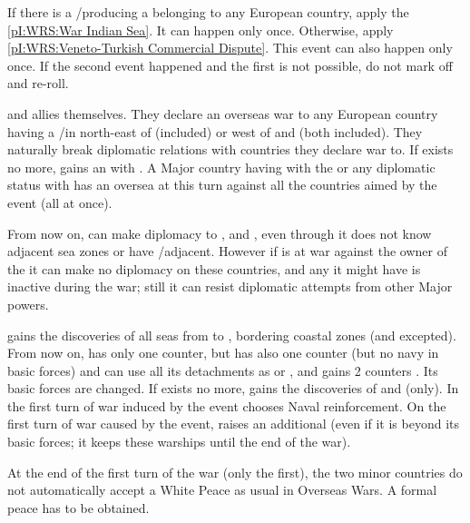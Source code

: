 \condition{}
\aparag If there is a \TP/\COL producing a \POSPICE belonging to any European
country, apply the \ref{pI:WRS:War Indian Sea}. It can happen only once.
\aparag Otherwise, apply \ref{pI:WRS:Veneto-Turkish Commercial Dispute}.  This
event can also happen only once.
\aparag If the second event happened and the first is not possible, do not
mark off and re-roll.



\phevnt
\aparag \paysEgypte and \paysGujerat allies themselves.  They declare an
overseas war to any European country having a \TP/\COL in \continentAfrica
north-east of \granderegionNatal (included) or \continentAsia west of
\granderegionMalaisie and \granderegionSumatra (both included). They naturally
break diplomatic relations with countries they declare war to.
\bparag If \paysEgypte exists no more, \TUR gains an \dipAT with \paysGujerat.
\aparag A Major country having  with the \paysGujerat or any
diplomatic status with \paysEgypte has an oversea \CB at this turn against all
the countries aimed by the event (all at once).

\phdipl
\aparag From now on, \VEN can make diplomacy to \paysAden, \paysOman and
\paysGujerat, even through it does not know adjacent sea zones or have
\TP/\COL adjacent. However if \VEN is at war against the owner of the
 it can make no diplomacy on these countries, and any
 it might have is inactive during the war; still it can resist
diplomatic attempts from other Major powers.

\phadm
\aparag \paysEgypte gains the discoveries of all seas from \seazoneErythree to
\seazoneMalaisie, bordering coastal zones (and \seazoneIndien excepted). From
now on, \paysEgypte has only one \ARMY counter, but has also one \FLEET
counter (but no navy in basic forces) and can use all its detachments as \LD
or \ND, and gains 2 counters \LDENDE. Its basic forces are changed.
\bparag If \paysEgypte exists no more, \TUR gains the discoveries of
\seazoneMascate and \seazoneKutch (only).
\aparag In the first turn of war induced by the event \paysEgypte chooses
Naval reinforcement.
\aparag On the first turn of war caused by the event, \paysGujerat raises an
additional \FLEET\facemoins (even if it is beyond its basic forces; it keeps
these warships until the end of the war).

\phpaix
\aparag At the end of the first turn of the war (only the first), the two
minor countries do not automatically accept a White Peace as usual in Overseas
Wars.  A formal peace has to be obtained.


